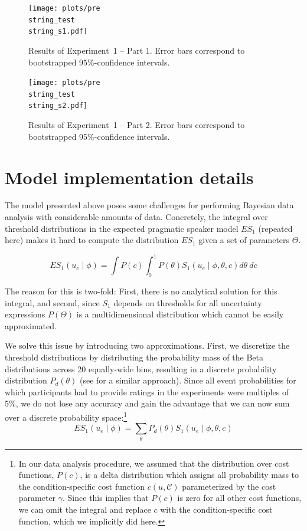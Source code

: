 \documentclass[man, floatsintext]{apa6}
\begin{document}
\begin{figure}[h!]
\texttt{[image: plots/pre\\string\_test\\string\_s1.pdf]}
\caption{Results of Experiment~1 -- Part 1. Error bars correspond to bootstrapped 95\%-confidence intervals. \label{fig:norming-results-1}}
\end{figure}

\begin{figure}[h!]
\texttt{[image: plots/pre\\string\_test\\string\_s2.pdf]}
\caption{Results of Experiment~1  -- Part 2. Error bars correspond to bootstrapped 95\%-confidence intervals. \label{fig:norming-results-2}}
\vspace{4cm}

\end{figure}


\section{Model implementation details}
\setcounter{section}{3}

The model presented above poses some challenges for performing Bayesian data analysis with considerable amounts of data. 
Concretely, the integral over threshold distributions in the expected pragmatic speaker model $ES_1$ (repeated here) makes it hard to compute 
the distribution $ES_1$ given a set of parameters $\Theta$.

$$ES_1\left(u_e \mid \phi \right) = \int P(c) \int_0^1 P(\theta) S_1\left(u _e\mid \phi, \theta, c\right) d\theta \  d c$$

The reason for this is two-fold: First, there is no analytical solution for this integral, and second, since $S_1$ depends on
thresholds for all uncertainty expressions $P(\Theta)$ is a multidimensional distribution which cannot be easily approximated.

We solve this issue by introducing two approximations. First, we discretize the threshold distributions by distributing the probability mass
of the Beta distributions across 20 equally-wide bins, resulting in a discrete probability distribution $P_{d}(\theta)$ (see \cite{Tessler2019} for a similar approach). Since all event probabilities for which participants had to provide ratings in the
experiments were multiples of 5\%, we do not lose any accuracy and gain the advantage that we can now sum over a discrete probability space:\footnote{In our data analysis procedure, we assumed that the 
distribution over cost functions, $P(c)$, is a delta distribution which assigns all probability mass to the condition-specific cost function 
$c(u, \mathscr{C})$ parameterized by the cost parameter $\gamma$. Since this implies that $P(c)$ is zero for all other cost functions, we can omit the integral and replace $c$ 
with the condition-specific cost function, which we implicitly did here.}
$$ES_1\left(u_e \mid \phi \right) = \sum_{\theta} P_{d}(\theta) S_1\left(u _e\mid \phi, \theta, c\right)$$
\end{document}
